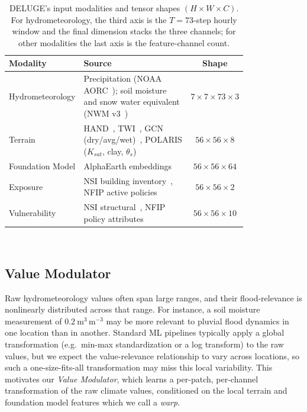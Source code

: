 \begin{table}[t]
\centering
\small
\setlength{\tabcolsep}{4pt}
\begin{tabular}{@{}p{0.18\linewidth}p{0.62\linewidth}c@{}}
\toprule
Modality & Source & Shape \\
\midrule
Hydrometeorology & Precipitation (NOAA AORC~\cite{fall_analysis_2023}); soil moisture and snow water equivalent (NWM v3~\cite{cosgrove_noaas_2024}) & $7 \times 7 \times 73 \times 3$ \\
Terrain & HAND~\cite{aws_copernicus_dem}, TWI~\cite{hoylman_30m_2021}, GCN (dry/avg/wet)~\cite{jaafar_gcn250_2019}, POLARIS ($K_{sat}$, clay, $\theta_s$)~\cite{chaney_polaris_2019} & $56 \times 56 \times 8$ \\
Foundation Model & AlphaEarth embeddings~\cite{brown_alphaearth_2025} & $56 \times 56 \times 64$ \\
Exposure & NSI building inventory~\cite{usace_nsi_2022}, NFIP active policies~\cite{fema_nfip_policies_v2} & $56 \times 56 \times 2$ \\
Vulnerability & NSI structural~\cite{usace_nsi_2022}, NFIP policy attributes~\cite{fema_nfip_policies_v2} & $56 \times 56 \times 10$ \\
\bottomrule
\end{tabular}\\[2pt]
\caption{DELUGE's input modalities and tensor shapes $(H \times W \times C)$. For hydrometeorology, the third axis is the $T=73$-step hourly window and the final dimension stacks the three channels; for other modalities the last axis is the feature-channel count.}
    \vspace{-0.15in}
\label{tab:inputs}
\end{table}

\subsection{Value Modulator}\label{sec:arch-warp}

Raw hydrometeorology values often span large ranges, and their flood-relevance is nonlinearly distributed across that range. 
%
For instance, a soil moisture measurement of $0.2~\mathrm{m^3\,m^{-3}}$ may be more relevant to pluvial flood dynamics in one location than in another.
%
Standard ML pipelines typically apply a global transformation (e.g.\ min-max standardization or a log transform) to the raw values, but we expect the value-relevance relationship to vary across locations, so such a one-size-fits-all transformation may miss this local variability.
%
This motivates our \emph{Value Modulator}, which learns a per-patch, per-channel transformation of the raw climate values, conditioned on the local terrain and foundation model features which we call a \emph{warp}.

